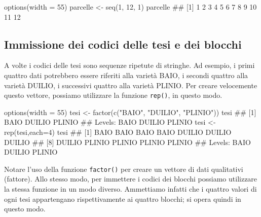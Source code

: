 \documentclass[a4paper,12pt,oneside]{book}
\newenvironment{Shaded}{\begin{snugshade}}{\end{snugshade}}
\newcommand{\DecValTok}[1]{#1}
\newcommand{\StringTok}[1]{#1}
\newcommand{\DocumentationTok}[1]{#1}
\newcommand{\OtherTok}[1]{#1}
\newcommand{\FunctionTok}[1]{#1}
\newcommand{\AttributeTok}[1]{#1}
\newcommand{\NormalTok}[1]{#1}
\begin{document}
\begin{Shaded}
\begin{Highlighting}[]
\FunctionTok{options}\NormalTok{(}\AttributeTok{width =} \DecValTok{55}\NormalTok{)}
\NormalTok{parcelle  }\OtherTok{\textless{}{-}}  \FunctionTok{seq}\NormalTok{(}\DecValTok{1}\NormalTok{, }\DecValTok{12}\NormalTok{, }\DecValTok{1}\NormalTok{)}
\NormalTok{parcelle}
\DocumentationTok{\#\#  [1]  1  2  3  4  5  6  7  8  9 10 11 12}
\end{Highlighting}
\end{Shaded}

\hypertarget{immissione-dei-codici-delle-tesi-e-dei-blocchi}{%
\subsection*{Immissione dei codici delle tesi e dei blocchi}\label{immissione-dei-codici-delle-tesi-e-dei-blocchi}}

A volte i codici delle tesi sono sequenze ripetute di stringhe. Ad esempio, i primi quattro dati potrebbero essere riferiti alla varietà BAIO, i secondi quattro alla varietà DUILIO, i successivi quattro alla varietà PLINIO. Per creare velocemente questo vettore, possiamo utilizzare la funzione \texttt{rep()}, in questo modo.

\begin{Shaded}
\begin{Highlighting}[]
\FunctionTok{options}\NormalTok{(}\AttributeTok{width =} \DecValTok{55}\NormalTok{)}
\NormalTok{tesi  }\OtherTok{\textless{}{-}}  \FunctionTok{factor}\NormalTok{(}\FunctionTok{c}\NormalTok{(}\StringTok{"BAIO"}\NormalTok{, }\StringTok{"DUILIO"}\NormalTok{, }\StringTok{"PLINIO"}\NormalTok{))}
\NormalTok{tesi}
\DocumentationTok{\#\# [1] BAIO   DUILIO PLINIO}
\DocumentationTok{\#\# Levels: BAIO DUILIO PLINIO}
\NormalTok{tesi  }\OtherTok{\textless{}{-}}  \FunctionTok{rep}\NormalTok{(tesi,}\AttributeTok{each=}\DecValTok{4}\NormalTok{)}
\NormalTok{tesi}
\DocumentationTok{\#\#  [1] BAIO   BAIO   BAIO   BAIO   DUILIO DUILIO DUILIO}
\DocumentationTok{\#\#  [8] DUILIO PLINIO PLINIO PLINIO PLINIO}
\DocumentationTok{\#\# Levels: BAIO DUILIO PLINIO}
\end{Highlighting}
\end{Shaded}

Notare l'uso della funzione \texttt{factor()} per creare un vettore di dati qualitativi (fattore). Allo stesso modo, per immettere i codici dei blocchi possiamo utilizzare la stessa funzione in un modo diverso. Ammettiamo infatti che i quattro valori di ogni tesi appartengano rispettivamente ai quattro blocchi; si opera quindi in questo modo.
\end{document}
